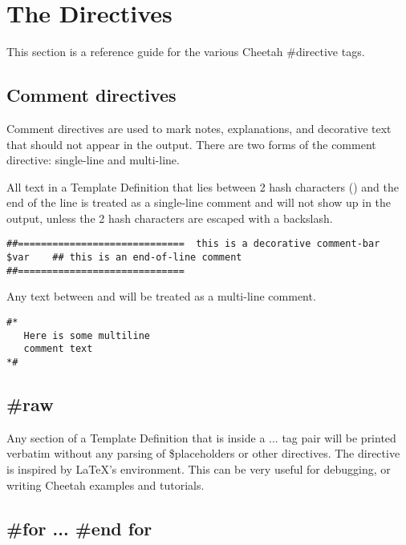 \section{The Directives}
\label{directives}

This section is a reference guide for the various Cheetah \#directive tags.

\subsection{Comment directives}
\label{directives.comments}

Comment directives are used to mark notes, explanations, and decorative text
that should not appear in the output.  There are two forms of the comment
directive: single-line and multi-line.

All text in a Template Definition that lies between 2 hash characters
(\code{\#\#}) and the end of the line is treated as a single-line comment and
will not show up in the output, unless the 2 hash characters are escaped with a
backslash.
\begin{verbatim}
##=============================  this is a decorative comment-bar
$var    ## this is an end-of-line comment
##=============================
\end{verbatim}

Any text between \code{\#*} and \code{*\#} will be treated as a multi-line
comment.
\begin{verbatim}
#*
   Here is some multiline
   comment text
*#
\end{verbatim}

\subsection{\#raw}
\label{directives.raw}

Any section of a Template Definition that is inside a  ...
 tag pair will be printed verbatim without any parsing of
\$placeholders or other directives. The  directive is inspired by
\LaTeX's  environment.  This can be very useful for debugging, or
writing Cheetah examples and tutorials.

\subsection{\#for ... \#end for}
\label{directives.for}

